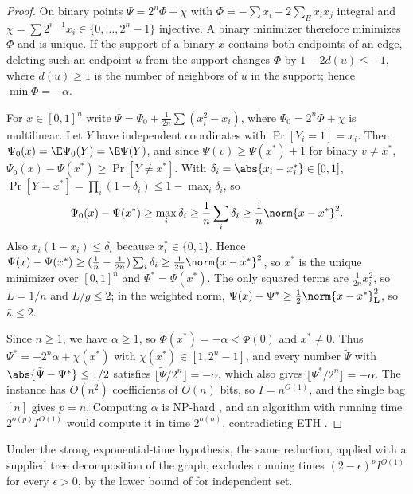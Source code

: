 \begin{proof}
On binary points $\Psi=2^n\Phi+\chi$ with $\Phi=-\sum x_i+2\sum_Ex_ix_j$
integral and $\chi=\sum2^{i-1}x_i\in\{0,\dots,2^n-1\}$ injective. A binary
minimizer therefore minimizes $\Phi$ and is unique. If the support of a
binary $x$ contains both endpoints of an edge, deleting such an endpoint $u$
from the support changes $\Phi$ by $1-2d(u)\le-1$, where $d(u)\ge1$ is the
number of neighbors of $u$ in the support; hence $\min\Phi=-\alpha$.

For $x\in[0,1]^n$ write $\Psi=\Psi_0+\frac1{2n}\sum(x_i^2-x_i)$, where
$\Psi_0=2^n\Phi+\chi$ is multilinear. Let $Y$ have independent coordinates
with $\Pr[Y_i=1]=x_i$. Then $\Psi_0(x)=\E\Psi_0(Y)=\E\Psi(Y)$, and since
$\Psi(v)\ge\Psi(x^*)+1$ for binary $v\ne x^*$,
$\Psi_0(x)-\Psi(x^*)\ge\Pr[Y\ne x^*]$. With
$\delta_i=\abs{x_i-x_i^*}\in[0,1]$,
$\Pr[Y=x^*]=\prod_i(1-\delta_i)\le1-\max_i\delta_i$, so
\begin{equation}\label{lim:eq:lbwidth}
\Psi_0(x)-\Psi(x^*)\ge\max_i\delta_i\ge\frac1n\sum_i\delta_i
\ge\frac1n\norm{x-x^*}^2 .
\end{equation}
Also $x_i(1-x_i)\le\delta_i$ because $x_i^*\in\{0,1\}$. Hence
$\Psi(x)-\Psi(x^*)\ge(\frac1n-\frac1{2n})\sum_i\delta_i\ge\frac1{2n}\norm{x-x^*}^2$,
so $x^*$ is the unique minimizer over $[0,1]^n$ and $\Psi^*=\Psi(x^*)$. The
only squared terms are $\frac1{2n}x_i^2$, so $L=1/n$ and $L/g\le2$; in the
weighted norm, $\Psi(x)-\Psi^*\ge\frac12\norm{x-x^*}_{\mathbf L}^2$, so
$\bar\kappa\le2$.

Since $n\ge1$, we have $\alpha\ge1$, so $\Phi(x^*)=-\alpha<\Phi(0)$ and
$x^*\ne0$. Thus $\Psi^*=-2^n\alpha+\chi(x^*)$ with
$\chi(x^*)\in[1,2^n-1]$, and every
number $\tilde\Psi$ with $\abs{\tilde\Psi-\Psi^*}\le1/2$ satisfies
$\lfloor\tilde\Psi/2^n\rfloor=-\alpha$, which
also gives $\lfloor\Psi^*/2^n\rfloor=-\alpha$. The instance has $O(n^2)$
coefficients of $O(n)$ bits, so $I=n^{O(1)}$, and the single bag $[n]$ gives
$p=n$. Computing $\alpha$ is NP-hard \cite{GareyJohnson1979}, and an
algorithm with running time $2^{o(p)}I^{O(1)}$ would compute it in time
$2^{o(n)}$, contradicting ETH \cite{ImpagliazzoPaturiZane2001}.
\end{proof}

Under the strong exponential-time hypothesis, the same reduction, applied with
a supplied tree decomposition of the graph, excludes running times
$(2-\epsilon)^pI^{O(1)}$ for every $\epsilon>0$, by the lower bound of
\cite{LokshtanovMarxSaurabh2018} for independent set.

